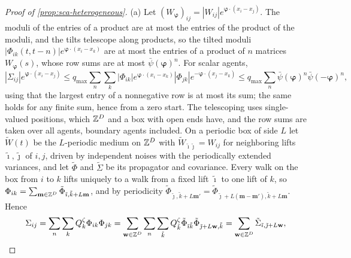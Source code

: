 \begin{proof}[Proof of \cref{prop:sca-heterogeneous}]
(a) Let $(W_{\boldsymbol\varphi})_{ij}=|W_{ij}|e^{\boldsymbol\varphi\cdot(x_i-x_j)}$. The moduli of the entries of a product are at most the entries of the product of the moduli, and the tilts telescope along products, so the tilted moduli $|\Phi_{ik}(t,t-n)|e^{\boldsymbol\varphi\cdot(x_i-x_k)}$ are at most the entries of a product of $n$ matrices $W_{\boldsymbol\varphi}(s)$, whose row sums are at most $\bar\psi(\boldsymbol\varphi)^n$. For scalar agents,
\begin{equation*}
|\Sigma_{ij}|e^{\boldsymbol\varphi\cdot(x_i-x_j)}\le q_{\max}\sum_n\sum_k|\Phi_{ik}|e^{\boldsymbol\varphi\cdot(x_i-x_k)}|\Phi_{jk}|e^{-\boldsymbol\varphi\cdot(x_j-x_k)}\le q_{\max}\sum_n\bar\psi(\boldsymbol\varphi)^n\bar\psi(-\boldsymbol\varphi)^n,
\end{equation*}
using that the largest entry of a nonnegative row is at most its sum; the same holds for any finite sum, hence from a zero start. The telescoping uses single-valued positions, which $\mathbb{Z}^D$ and a box with open ends have, and the row sums are taken over all agents, boundary agents included. On a periodic box of side $L$ let $\tilde W(t)$ be the $L$-periodic medium on $\mathbb{Z}^D$ with $\tilde W_{\tilde\imath\tilde\jmath}=W_{ij}$ for neighboring lifts $\tilde\imath,\tilde\jmath$ of $i,j$, driven by independent noises with the periodically extended variances, and let $\tilde\Phi$ and $\tilde\Sigma$ be its propagator and covariance. Every walk on the box from $i$ to $k$ lifts uniquely to a walk from a fixed lift $\tilde\imath$ to one lift of $k$, so $\Phi_{ik}=\sum_{\mathbf m\in\mathbb{Z}^D}\tilde\Phi_{\tilde\imath,\tilde k+L\mathbf m}$, and by periodicity $\tilde\Phi_{\tilde\jmath,\tilde k+L\mathbf m'}=\tilde\Phi_{\tilde\jmath+L(\mathbf m-\mathbf m'),\tilde k+L\mathbf m}$. Hence
\begin{equation*}
\Sigma_{ij}=\sum_n\sum_kQ^\zeta_k\Phi_{ik}\Phi_{jk}=\sum_{\mathbf w\in\mathbb{Z}^D}\sum_n\sum_{\tilde k}Q^\zeta_{\tilde k}\tilde\Phi_{\tilde\imath\tilde k}\tilde\Phi_{\tilde\jmath+L\mathbf w,\tilde k}=\sum_{\mathbf w\in\mathbb{Z}^D}\tilde\Sigma_{\tilde\imath,\tilde\jmath+L\mathbf w},
\end{equation*}

\end{proof}
